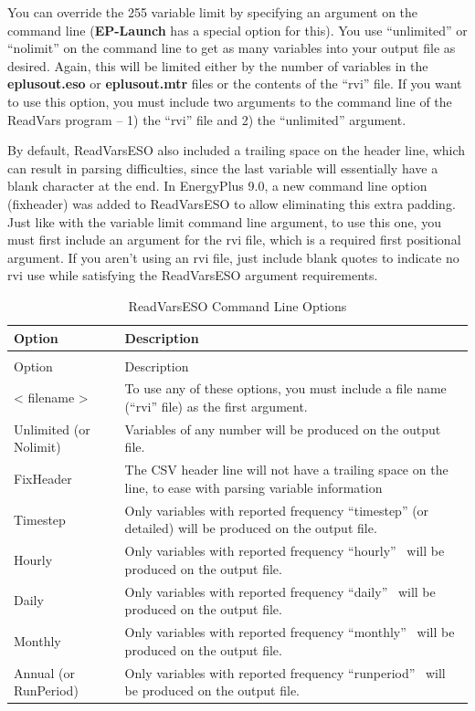 You can override the 255 variable limit by specifying an argument on the command line (\textbf{EP-Launch} has a special option for this). You use ``unlimited'' or ``nolimit'' on the command line to get as many variables into your output file as desired. Again, this will be limited either by the number of variables in the \textbf{eplusout.eso} or \textbf{eplusout.mtr} files or the contents of the ``rvi'' file. If you want to use this option, you must include two arguments to the command line of the ReadVars program -- 1) the ``rvi'' file and 2) the ``unlimited'' argument.

By default, ReadVarsESO also included a trailing space on the header line, which can result in parsing difficulties, since the last variable will essentially have a blank character at the end.  In EnergyPlus 9.0, a new command line option (fixheader) was added to ReadVarsESO to allow eliminating this extra padding.  Just like with the variable limit command line argument, to use this one, you must first include an argument for the rvi file, which is a required first positional argument.  If you aren't using an rvi file, just include blank quotes to indicate no rvi use while satisfying the ReadVarsESO argument requirements.

\begin{longtable}[c]{p{1.5in}p{4.5in}}
\caption{ReadVarsESO Command Line Options \label{table:readvarseso-command-line-options}} \tabularnewline
\toprule
Option & Description \tabularnewline
\midrule
\endfirsthead

\caption[]{ReadVarsESO Command Line Options} \tabularnewline
\toprule
Option & Description \tabularnewline
\midrule
\endhead

< filename > & To use any of these options, you must include a file name (“rvi” file) as the first argument. \tabularnewline
Unlimited (or Nolimit) & Variables of any number will be produced on the output file. \tabularnewline
FixHeader & The CSV header line will not have a trailing space on the line, to ease with parsing variable information \tabularnewline
Timestep & Only variables with reported frequency “timestep” (or detailed) will be produced on the output file. \tabularnewline
Hourly & Only variables with reported frequency “hourly”~ will be produced on the output file. \tabularnewline
Daily & Only variables with reported frequency “daily”~ will be produced on the output file. \tabularnewline
Monthly & Only variables with reported frequency “monthly”~ will be produced on the output file. \tabularnewline
Annual (or RunPeriod) & Only variables with reported frequency “runperiod”~ will be produced on the output file. \tabularnewline
\bottomrule
\end{longtable}

